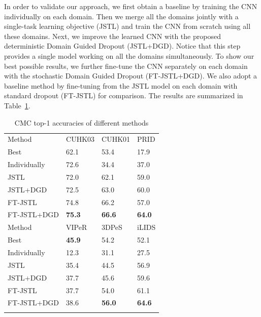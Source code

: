 In order to validate our approach, we first obtain a baseline by training the CNN individually on each domain. Then we merge all the domains jointly with a single-task learning objective (JSTL) and train the CNN from scratch using all these domains. Next, we improve the learned CNN with the proposed deterministic Domain Guided Dropout (JSTL+DGD). Notice that this step provides a single model working on all the domains simultaneously. To show our best possible results, we further fine-tune the CNN separately on each domain with the stochastic Domain Guided Dropout (FT-JSTL+DGD). We also adopt a baseline method by fine-tuning from the JSTL model on each domain with standard dropout (FT-JSTL) for comparison. The results are summarized in Table~\ref{tab:comparison_with_sota}.

\begin{table}[t]
\small
\begin{center}
\begin{tabular}{llll}
\hline\noalign{\smallskip}
\noalign{\smallskip}
Method & CUHK03 & CUHK01 & PRID\\
\noalign{\smallskip}\hline\hline\noalign{\smallskip}
Best & 62.1~\cite{paisitkriangkrai2015learning} & 53.4~\cite{paisitkriangkrai2015learning} & 17.9~\cite{paisitkriangkrai2015learning} \\
Individually & 72.6 & 34.4 & 37.0 \\
JSTL & 72.0 & 62.1 & 59.0 \\
JSTL+DGD & 72.5 & 63.0 & 60.0 \\
FT-JSTL & 74.8 & 66.2 & 57.0 \\
FT-JSTL+DGD & \textbf{75.3} & \textbf{66.6} & \textbf{64.0} \\
\hline\noalign{\smallskip}
\noalign{\smallskip}
Method & VIPeR & 3DPeS & iLIDS \\
\noalign{\smallskip}\hline\hline\noalign{\smallskip}
Best & \textbf{45.9}~\cite{paisitkriangkrai2015learning} & 54.2~\cite{xiong2014person} & 52.1~\cite{ding2015deep} \\
Individually & 12.3 & 31.1 & 27.5 \\
JSTL & 35.4 & 44.5 & 56.9 \\
JSTL+DGD & 37.7 & 45.6 & 59.6 \\
FT-JSTL & 37.7 & 54.0 & 61.1 \\
FT-JSTL+DGD & 38.6 & \textbf{56.0} & \textbf{64.6} \\
\hline\noalign{\smallskip}
\end{tabular}
\end{center}
\caption{CMC top-1 accuracies of different methods}
\label{tab:comparison_with_sota}
\end{table}

